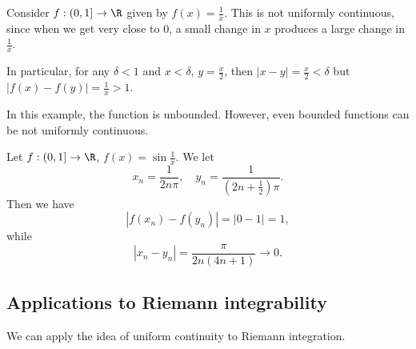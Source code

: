 \documentclass[a4paper]{article}
\begin{document}
\begin{eg}
Consider $f: (0, 1] \to \R$ given by $f(x) = \frac{1}{x}$. This is not uniformly continuous, since when we get very close to $0$, a small change in $x$ produces a large change in $\frac{1}{x}$.

In particular, for any $\delta < 1$ and $x < \delta$, $y = \frac{x}{2}$, then $|x - y| = \frac{x}{2} < \delta$ but $|f(x) - f(y)| = \frac{1}{x} > 1$.
\end{eg}

In this example, the function is unbounded. However, even bounded functions can be not uniformly continuous.
\begin{eg}
Let $f: (0, 1] \to \R$, $f(x) = \sin \frac{1}{x}$. We let
\[
  x_n = \frac{1}{2n\pi},\quad y_n = \frac{1}{(2n + \frac{1}{2})\pi}.
\]
Then we have
\[
  |f(x_n) - f(y_n)| = |0 - 1| = 1,
\]
while
\[
  |x_n - y_n| = \frac{\pi}{2n(4n + 1)} \to 0.
\]
\end{eg}

\subsection{Applications to Riemann integrability}
We can apply the idea of uniform continuity to Riemann integration.
\end{document}
